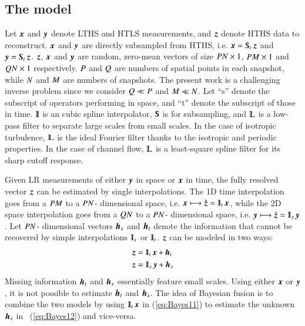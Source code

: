 \subsection{The model} 
Let $ \operatorname{\boldsymbol{x}} $ and $ \operatorname{\boldsymbol{y}} $ denote LTHS and HTLS measurements, and $ \operatorname{\boldsymbol{z}} $ denote HTHS data to reconstruct. $ \operatorname{\boldsymbol{x}} $ and $ \operatorname{\boldsymbol{y}} $ are directly subsampled from HTHS, i.e. $ \x = \Sub_t\z $ and $ \y = \Sub_t\z $. $ \operatorname{\boldsymbol{z}} $, $ \operatorname{\boldsymbol{x}} $ and $ \operatorname{\boldsymbol{y}} $ are random, zero-mean vectors of size $ P N \times 1$, $ P M \times 1$ and $Q N \times 1$ respectively.  $ P  $ and $ Q  $ are numbers of spatial points in each snapshot, while $ N $ and $ M $ are numbers of snapshots. The present work is a challenging inverse problem since we consider  $ Q  \ll P  $ and $ M \ll N $.
Let ``s'' denote the subscript of operators performing in space, and ``t'' denote the subscript of those in time. $ \Interp $ is an cubic spline interpolator, $ \Sub $ is for subsampling, and $ \LPF $ is a low-pass filter to separate large scales from small scales. In the case of isotropic turbulence,  $ \LPF $ is the ideal Fourier filter thanks to the isotropic and periodic properties. In the case of channel flow,  $ \LPF $ is a least-square spline filter for its sharp cutoff response.

Given LR measurements of either $ \operatorname{\boldsymbol{y}}  $ in space or $ \operatorname{\boldsymbol{x}}  $ in time, the fully resolved vector $ \operatorname{\boldsymbol{z}}  $ can be estimated by single interpolations. The 1D time interpolation goes from a $ P M $ to a $ P N $- dimensional space, i.e. $ \x  \mymapto \hat{\z }=\Interp_t \x  $, while the 2D space interpolation goes from a $ Q N$ to a $ P N $- dimensional space, i.e. $ \y  \mymapto \hat{\z }=\Interp_s \y $. Let $ P N $- dimensional vectors $ \operatorname{\boldsymbol{h}}_s $ and $ \operatorname{\boldsymbol{h}}_t $ denote the information that cannot be recovered by simple interpolations $ \Interp_s $ or $ \Interp_t $. $\operatorname{\boldsymbol{z}}  $ can be modeled in two ways:
\begin{align}
	\z  &= \Interp_t\x +\h_t \label{eq:Bayes11}\\
	\z  &= \Interp_s\y +\h_s \label{eq:Bayes12}	
\end{align}
Missing information $ \operatorname{\boldsymbol{h}}_t $ and $ \operatorname{\boldsymbol{h}}_s $ essentially feature small scales. Using either $ \operatorname{\boldsymbol{x}}  $ or $ \operatorname{\boldsymbol{y}}  $, it is not possible to estimate $ \operatorname{\boldsymbol{h}}_t $ and $ \operatorname{\boldsymbol{h}}_s $. The idea of Bayesian fusion is to combine the two models by using $ \Interp_t\x  $ in (\ref{eq:Bayes11}) to estimate the unknown $ \operatorname{\boldsymbol{h}}_s $ in ~(\ref{eq:Bayes12}) and vice-versa.

